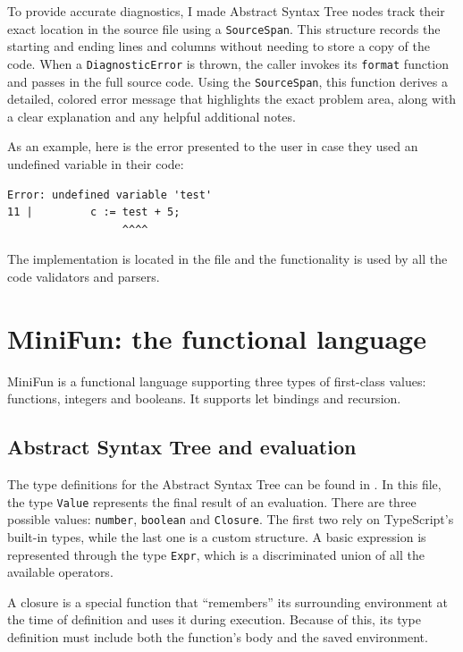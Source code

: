 \documentclass[12pt]{article}
\newcommand{\Code}[1]{\texttt{#1}}
\begin{document}
To provide accurate diagnostics, I made Abstract Syntax Tree nodes track
their exact location in the source file using a \Code{SourceSpan}. This
structure records the starting and ending lines and columns without needing to
store a copy of the code. When a \Code{DiagnosticError} is thrown, the caller
invokes its \Code{format} function and passes in the full source code. Using the
\Code{SourceSpan}, this function derives a detailed, colored error message that
highlights the exact problem area, along with a clear explanation and any
helpful additional notes.

As an example, here is the error presented to the user in case they used an
undefined variable in their code:
\begin{verbatim}
Error: undefined variable 'test'
11 |         c := test + 5;
                  ^^^^
\end{verbatim}

The implementation is located in the file  and the
functionality is used by all the code validators and parsers.

\section{MiniFun: the functional language}

MiniFun is a functional language supporting three types of first-class values:
functions, integers and booleans. It supports let bindings and recursion.

\subsection{Abstract Syntax Tree and evaluation}

The type definitions for the Abstract Syntax Tree can be found in
. In this file, the type \Code{Value} represents
the final result of an evaluation. There are three possible values:
\Code{number}, \Code{boolean} and \Code{Closure}. The first two rely
on TypeScript's built-in types, while the last one is a custom structure. A
basic expression is represented through the type \Code{Expr}, which is a
discriminated union of all the available operators.

A closure is a special function that ``remembers'' its surrounding environment
at the time of definition and uses it during execution. Because of this, its
type definition must include both the function's body and the saved environment.
\end{document}
